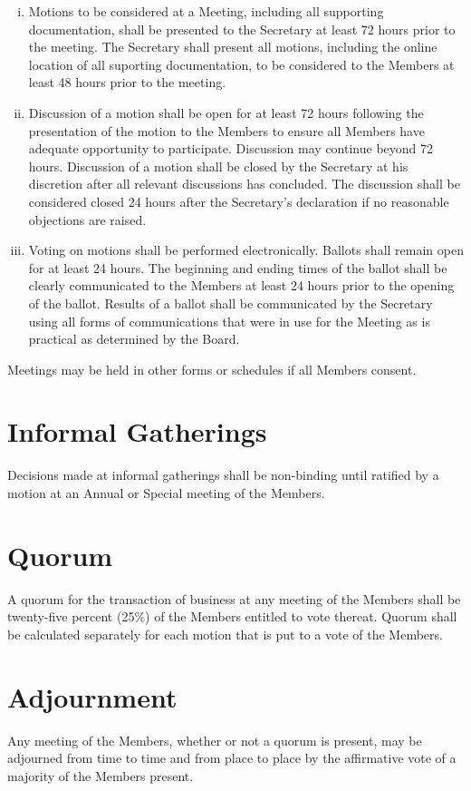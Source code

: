 \documentclass[10pt, english]{bylaws}
\begin{document}
\begin{enumerate}[(i)\hspace{.2cm}]
	\item Motions to be considered at a Meeting, including all supporting
	documentation, shall be presented to the Secretary at least 72 hours
	prior to the meeting. The Secretary shall present all motions, including
	the online location of all suporting documentation, to be considered to
	the Members at least 48 hours prior to the meeting.

	\item Discussion of a motion shall be open for at least 72 hours
	following the presentation of the motion to the Members to ensure all
	Members have adequate opportunity to participate. Discussion may
	continue beyond 72 hours. Discussion of a motion shall be closed by the
	Secretary at his discretion after all relevant discussions has
	concluded. The discussion shall be considered closed 24 hours after the
	Secretary's declaration if no reasonable objections are raised.

	\item Voting on motions shall be performed electronically. Ballots shall
	remain open for at least 24 hours. The beginning and ending times of
	the ballot shall be clearly communicated to the Members at least 24
	hours prior to the opening of the ballot. Results of a ballot shall be
	communicated by the Secretary using all forms of communications that
	were in use for the Meeting as is practical as determined by the Board.
\end{enumerate}

Meetings may be held in other forms or schedules if all Members consent.

\section{Informal Gatherings}
Decisions made at informal gatherings shall be non-binding until ratified by a
motion at an Annual or Special meeting of the Members.

\section{Quorum}
A quorum for the transaction of business at any meeting of the Members shall be
twenty-five percent (25\%) of the Members entitled to vote thereat. Quorum shall
be calculated separately for each motion that is put to a vote of the Members.

\section{Adjournment}
Any meeting of the Members, whether or not a quorum is present, may be adjourned
from time to time and from place to place by the affirmative vote of a majority
of the Members present.
\end{document}
